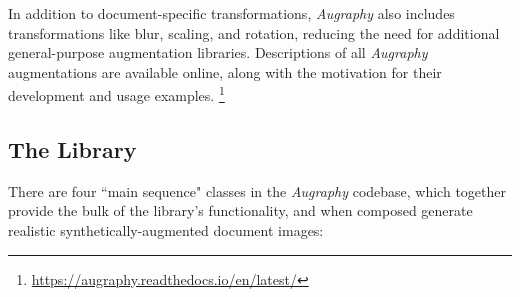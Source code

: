 \documentclass[runningheads]{llncs}
\begin{document}
\begin{table}[]
    \centering
    \caption{Individual \emph{Augraphy} augmentations for each augmentation phase, in suggested position within a pipeline. Augmentations that work well in more than one phase are listed in the last column.}
    \label{tab:augmentations}
\end{table}

In addition to document-specific transformations, \emph{Augraphy} also includes transformations like blur, scaling, and rotation, reducing the need for additional general-purpose augmentation libraries.
Descriptions of all \emph{Augraphy} augmentations are available online, along with the motivation for their development and usage examples. \footnote{\url{https://augraphy.readthedocs.io/en/latest/}}

\subsection{The Library}
There are four ``main sequence" classes in the \emph{Augraphy} codebase, which together provide the bulk of the library's functionality, and when composed generate realistic synthetically-augmented document images:
\end{document}
